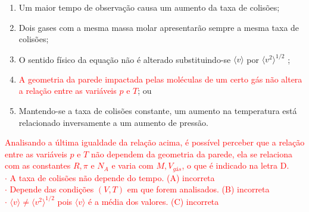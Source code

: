 \documentclass[12pt,a4paper]{article}
\begin{document}
\begin{enumerate} [label = (\alph*)]
    \item Um maior tempo de observação causa um aumento da taxa de colisões;
    \item Dois gases com a mesma massa molar apresentarão sempre a mesma taxa de colisões;
    \item O sentido físico da equação não é alterado substituindo-se $\langle v \rangle$ por $\langle v^{2} \rangle^{1/2}$ ;
    \item \textcolor{red}{A geometria da parede impactada pelas moléculas de um certo gás não altera a relação entre as variáveis $p$ e $T$}; ou
    \item Mantendo-se a taxa de colisões constante, um aumento na temperatura está relacionado inversamente a um aumento de pressão.
    
\end{enumerate}

\textcolor{red}{Analisando a última igualdade da relação acima, é possível perceber que a relação entre as variáveis $p$ e $T$ não dependem da geometria da parede, ela se relaciona com as constantes $R, \pi $ e $N_{A}$ e varia com $M, V_{gás}$, o que é indicado na letra D.\\
$\cdot$ A taxa de colisões não depende do tempo. (A) incorreta\\
$\cdot$ Depende das condições $(V, T)$ em que forem analisados. (B) incorreta\\
$\cdot$ $\langle v \rangle \neq \langle v^{2} \rangle^{1/2}$ pois $\langle v \rangle$ é a média dos valores. (C) incorreta}
\end{document}
